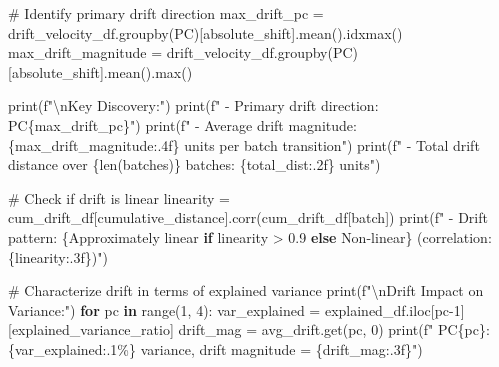 \documentclass[
  letterpaper,
  DIV=11,
  numbers=noendperiod]{scrartcl}
\newenvironment{Shaded}{\begin{snugshade}}{\end{snugshade}}
\newcommand{\BuiltInTok}[1]{\textcolor[rgb]{0.00,0.23,0.31}{#1}}
\newcommand{\CharTok}[1]{\textcolor[rgb]{0.13,0.47,0.30}{#1}}
\newcommand{\CommentTok}[1]{\textcolor[rgb]{0.37,0.37,0.37}{#1}}
\newcommand{\ControlFlowTok}[1]{\textcolor[rgb]{0.00,0.23,0.31}{\textbf{#1}}}
\newcommand{\DecValTok}[1]{\textcolor[rgb]{0.68,0.00,0.00}{#1}}
\newcommand{\FloatTok}[1]{\textcolor[rgb]{0.68,0.00,0.00}{#1}}
\newcommand{\KeywordTok}[1]{\textcolor[rgb]{0.00,0.23,0.31}{\textbf{#1}}}
\newcommand{\NormalTok}[1]{\textcolor[rgb]{0.00,0.23,0.31}{#1}}
\newcommand{\OperatorTok}[1]{\textcolor[rgb]{0.37,0.37,0.37}{#1}}
\newcommand{\SpecialCharTok}[1]{\textcolor[rgb]{0.37,0.37,0.37}{#1}}
\newcommand{\SpecialStringTok}[1]{\textcolor[rgb]{0.13,0.47,0.30}{#1}}
\newcommand{\StringTok}[1]{\textcolor[rgb]{0.13,0.47,0.30}{#1}}
\renewenvironment{Shaded}{%
  \begin{tcolorbox}[%
    enhanced,%
    colback=codebg,%
    colframe=codebg,%
    borderline west={3pt}{0pt}{sectionblue},%
    fontupper=\small\ttfamily,%
    boxrule=0pt,%
    arc=0pt,%
    boxsep=5pt,%
    left=2mm,%
    right=2mm,%
    top=2mm,%
    bottom=2mm%
  ]%
}{%
  \end{tcolorbox}%
}
\begin{document}
\begin{Shaded}
\begin{Highlighting}[]
\CommentTok{\# Identify primary drift direction}
\NormalTok{max\_drift\_pc }\OperatorTok{=}\NormalTok{ drift\_velocity\_df.groupby(}\StringTok{\textquotesingle{}PC\textquotesingle{}}\NormalTok{)[}\StringTok{\textquotesingle{}absolute\_shift\textquotesingle{}}\NormalTok{].mean().idxmax()}
\NormalTok{max\_drift\_magnitude }\OperatorTok{=}\NormalTok{ drift\_velocity\_df.groupby(}\StringTok{\textquotesingle{}PC\textquotesingle{}}\NormalTok{)[}\StringTok{\textquotesingle{}absolute\_shift\textquotesingle{}}\NormalTok{].mean().}\BuiltInTok{max}\NormalTok{()}

\BuiltInTok{print}\NormalTok{(}\SpecialStringTok{f"}\CharTok{\textbackslash{}n}\SpecialStringTok{Key Discovery:"}\NormalTok{)}
\BuiltInTok{print}\NormalTok{(}\SpecialStringTok{f"  {-} Primary drift direction: PC}\SpecialCharTok{\{}\NormalTok{max\_drift\_pc}\SpecialCharTok{\}}\SpecialStringTok{"}\NormalTok{)}
\BuiltInTok{print}\NormalTok{(}\SpecialStringTok{f"  {-} Average drift magnitude: }\SpecialCharTok{\{}\NormalTok{max\_drift\_magnitude}\SpecialCharTok{:.4f\}}\SpecialStringTok{ units per batch transition"}\NormalTok{)}
\BuiltInTok{print}\NormalTok{(}\SpecialStringTok{f"  {-} Total drift distance over }\SpecialCharTok{\{}\BuiltInTok{len}\NormalTok{(batches)}\SpecialCharTok{\}}\SpecialStringTok{ batches: }\SpecialCharTok{\{}\NormalTok{total\_dist}\SpecialCharTok{:.2f\}}\SpecialStringTok{ units"}\NormalTok{)}

\CommentTok{\# Check if drift is linear}
\NormalTok{linearity }\OperatorTok{=}\NormalTok{ cum\_drift\_df[}\StringTok{\textquotesingle{}cumulative\_distance\textquotesingle{}}\NormalTok{].corr(cum\_drift\_df[}\StringTok{\textquotesingle{}batch\textquotesingle{}}\NormalTok{])}
\BuiltInTok{print}\NormalTok{(}\SpecialStringTok{f"  {-} Drift pattern: }\SpecialCharTok{\{}\StringTok{\textquotesingle{}Approximately linear\textquotesingle{}} \ControlFlowTok{if}\NormalTok{ linearity }\OperatorTok{\textgreater{}} \FloatTok{0.9} \ControlFlowTok{else} \StringTok{\textquotesingle{}Non{-}linear\textquotesingle{}}\SpecialCharTok{\}}\SpecialStringTok{ (correlation: }\SpecialCharTok{\{}\NormalTok{linearity}\SpecialCharTok{:.3f\}}\SpecialStringTok{)"}\NormalTok{)}

\CommentTok{\# Characterize drift in terms of explained variance}
\BuiltInTok{print}\NormalTok{(}\SpecialStringTok{f"}\CharTok{\textbackslash{}n}\SpecialStringTok{Drift Impact on Variance:"}\NormalTok{)}
\ControlFlowTok{for}\NormalTok{ pc }\KeywordTok{in} \BuiltInTok{range}\NormalTok{(}\DecValTok{1}\NormalTok{, }\DecValTok{4}\NormalTok{):}
\NormalTok{    var\_explained }\OperatorTok{=}\NormalTok{ explained\_df.iloc[pc}\OperatorTok{{-}}\DecValTok{1}\NormalTok{][}\StringTok{\textquotesingle{}explained\_variance\_ratio\textquotesingle{}}\NormalTok{]}
\NormalTok{    drift\_mag }\OperatorTok{=}\NormalTok{ avg\_drift.get(pc, }\DecValTok{0}\NormalTok{)}
    \BuiltInTok{print}\NormalTok{(}\SpecialStringTok{f"  PC}\SpecialCharTok{\{}\NormalTok{pc}\SpecialCharTok{\}}\SpecialStringTok{: }\SpecialCharTok{\{}\NormalTok{var\_explained}\SpecialCharTok{:.1\%\}}\SpecialStringTok{ variance, drift magnitude = }\SpecialCharTok{\{}\NormalTok{drift\_mag}\SpecialCharTok{:.3f\}}\SpecialStringTok{"}\NormalTok{)}


\end{Highlighting}
\end{Shaded}
\end{document}
